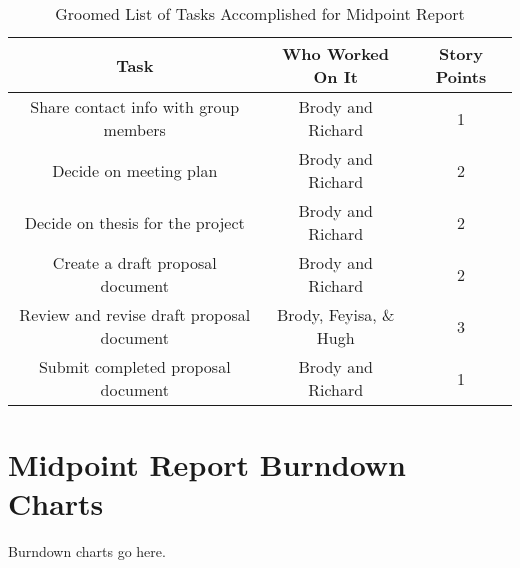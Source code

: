 \documentclass[conference]{IEEEtran}
\begin{document}
\begin{table}
\caption{Groomed List of Tasks Accomplished for Midpoint Report}
\begin{tabular}{|c|c|c|}
\hline
\textbf{Task} & \textbf{Who Worked On It} & \textbf{Story Points} \\ \hline \hline
Share contact info with group members & Brody and Richard & 1 \\ \hline
Decide on meeting plan & Brody and Richard & 2 \\ \hline
Decide on thesis for the project & Brody and Richard & 2 \\ \hline
Create a draft proposal document & Brody and Richard & 2 \\ \hline
Review and revise draft proposal document & Brody, Feyisa, \& Hugh & 3 \\ \hline
Submit completed proposal document & Brody and Richard & 1 \\ \hline
\hline
\end{tabular}
\end{table}

\section{Midpoint Report Burndown Charts}
Burndown charts go here.




\end{document}
